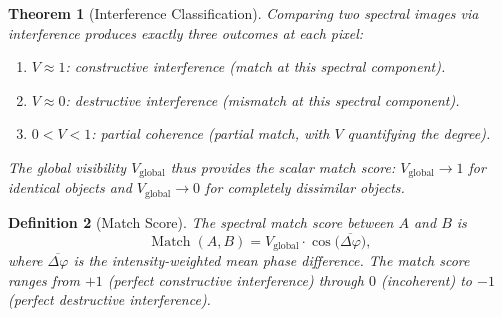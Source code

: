 \documentclass[11pt,twocolumn,a4paper]{article}
\newtheorem{theorem}{Theorem}[section]
\newtheorem{definition}[theorem]{Definition}
\DeclareMathOperator{\Match}{Match}
\begin{document}
\begin{theorem}[Interference Classification]
\label{thm:interference_classification}
Comparing two spectral images via interference produces exactly three
outcomes at each pixel:
\begin{enumerate}[label=(\roman*),nosep]
  \item $V \approx 1$: constructive interference (match at this spectral
    component).
  \item $V \approx 0$: destructive interference (mismatch at this
    spectral component).
  \item $0 < V < 1$: partial coherence (partial match, with $V$
    quantifying the degree).
\end{enumerate}
The global visibility $V_{\text{global}}$ thus provides the scalar
match score: $V_{\text{global}} \to 1$ for identical objects and
$V_{\text{global}} \to 0$ for completely dissimilar objects.
\end{theorem}

\begin{definition}[Match Score]
\label{def:match_score}
The spectral match score between $A$ and $B$ is
\begin{equation}
\label{eq:match_score}
  \Match(A, B) = V_{\text{global}} \cdot \cos\bigl(\overline{\Delta\varphi}\bigr),
\end{equation}
where $\overline{\Delta\varphi}$ is the intensity-weighted mean phase
difference. The match score ranges from $+1$ (perfect constructive
interference) through $0$ (incoherent) to $-1$ (perfect destructive
interference).
\end{definition}
\end{document}

